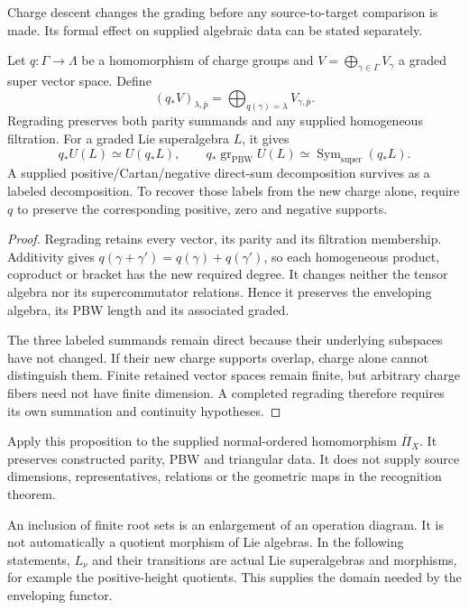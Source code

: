 Charge descent changes the grading before any source-to-target
comparison is made. Its formal effect on supplied algebraic data
can be stated separately.

\begin{proposition}
\label{prop:recognition-additive-regrading}
Let $q:\Gamma\to\Lambda$ be a homomorphism of charge groups and
$V=\bigoplus_{\gamma\in\Gamma}V_\gamma$ a graded super vector space.
Define
\[
 (q_*V)_{\lambda,\bar p}
   =\bigoplus_{q(\gamma)=\lambda}V_{\gamma,\bar p}.
\]
Regrading preserves both parity summands and any supplied
homogeneous filtration. For a graded Lie superalgebra $L$, it gives
\[
 q_*U(L)\simeq U(q_*L),\qquad
 q_*\operatorname{gr}_{\mathrm{PBW}}U(L)
   \simeq\operatorname{Sym}_{\mathrm{super}}(q_*L).
\]
A supplied positive/Cartan/negative direct-sum decomposition
survives as a labeled decomposition. To recover those labels from
the new charge alone, require $q$ to preserve the corresponding
positive, zero and negative supports.
\end{proposition}
\begin{proof}
Regrading retains every vector, its parity and its filtration
membership. Additivity gives $q(\gamma+\gamma')=q(\gamma)+q(\gamma')$,
so each homogeneous product, coproduct or bracket has the new
required degree. It changes neither the tensor algebra nor its
supercommutator relations. Hence it preserves the enveloping
algebra, its PBW length and its associated graded.

The three labeled summands remain direct because their underlying
subspaces have not changed. If their new charge supports overlap,
charge alone cannot distinguish them. Finite retained vector spaces
remain finite, but arbitrary charge fibers need not have finite
dimension. A completed regrading therefore requires its own
summation and continuity hypotheses.
\end{proof}

Apply this proposition to the supplied normal-ordered homomorphism
$\overline\Pi_X$. It preserves constructed parity, PBW and triangular
data. It does not supply source dimensions, representatives,
relations or the geometric maps in the recognition theorem.

An inclusion of finite root sets is an enlargement of an operation
diagram. It is not automatically a quotient morphism of Lie
algebras. In the following statements, $L_\nu$ and their transitions
are actual Lie superalgebras and morphisms, for example the
positive-height quotients. This supplies the domain needed by the
enveloping functor.

